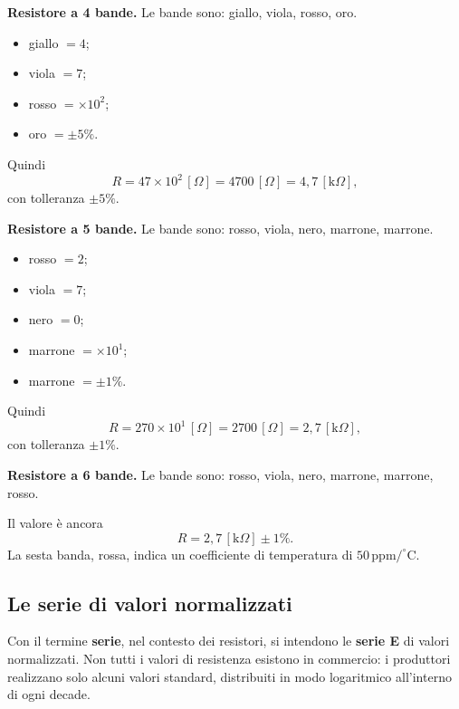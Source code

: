 \begin{esempio}
\textbf{Resistore a 4 bande.} Le bande sono: giallo, viola, rosso, oro.

\begin{itemize}[leftmargin=1cm]
  \item giallo \(= 4\);
  \item viola \(= 7\);
  \item rosso \(= \times 10^2\);
  \item oro \(= \pm 5\%\).
\end{itemize}

Quindi
\[
R = 47 \times 10^2\,[\Omega] = 4700\,[\Omega] = 4{,}7\,[\text{k}\Omega],
\]
con tolleranza \(\pm 5\%\).
\end{esempio}

\begin{esempio}
\textbf{Resistore a 5 bande.} Le bande sono: rosso, viola, nero, marrone, marrone.

\begin{itemize}[leftmargin=1cm]
  \item rosso \(= 2\);
  \item viola \(= 7\);
  \item nero \(= 0\);
  \item marrone \(= \times 10^1\);
  \item marrone \(= \pm 1\%\).
\end{itemize}

Quindi
\[
R = 270 \times 10^1\,[\Omega] = 2700\,[\Omega] = 2{,}7\,[\text{k}\Omega],
\]
con tolleranza \(\pm 1\%\).
\end{esempio}

\begin{esempio}
\textbf{Resistore a 6 bande.} Le bande sono: rosso, viola, nero, marrone, marrone, rosso.

Il valore è ancora
\[
R = 2{,}7\,[\text{k}\Omega] \pm 1\%.
\]
La sesta banda, rossa, indica un coefficiente di temperatura di \(50\,\text{ppm}/^\circ\text{C}\).
\end{esempio}

\subsection{Le serie di valori normalizzati}

Con il termine \textbf{serie}, nel contesto dei resistori, si intendono le \textbf{serie E} di valori normalizzati. Non tutti i valori di resistenza esistono in commercio: i produttori realizzano solo alcuni valori standard, distribuiti in modo logaritmico all'interno di ogni decade.

